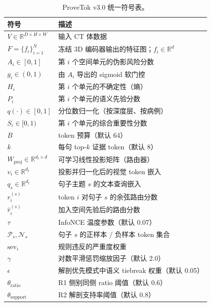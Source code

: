 \documentclass[11pt,a4paper]{article}
\newcommand{\RR}{\mathbb{R}}
\theoremstyle{definition}
\begin{document}
\begin{table}[ht]
\centering\small
\begin{tabularx}{\linewidth}{lX}
\toprule
\textbf{符号} & \textbf{描述} \\
\midrule
$V \in \RR^{D \times H \times W}$ & 输入 CT 体数据 \\
$F = \{f_i\}_{i=1}^{N}$ & 冻结 3D 编码器输出的特征图；$f_i \in \RR^d$ \\
$A_i \in [0,1]$ & 第 $i$ 个空间单元的伪影风险分数 \\
$g_i \in (0,1)$ & 由 $A_i$ 导出的 sigmoid 软门控 \\
$H_i$ & 第 $i$ 个单元的不确定性（熵） \\
$P_i$ & 第 $i$ 个单元的语义先验分数 \\
$q(\cdot) \in [0,1]$ & 分位数归一化（按深度层、按病例） \\
$S_i \in [0,1)$ & 第 $i$ 个单元的综合重要性分数 \\
$B$ & token 预算（默认 64） \\
$k$ & 每句 top-$k$ 证据 token（默认 8） \\
$W_{\mathrm{proj}} \in \RR^{d_t \times d}$ & 可学习线性投影矩阵（路由器） \\
$v_i \in \RR^{d_t}$ & 投影并归一化后的视觉 token 嵌入 \\
$q_s \in \RR^{d_t}$ & 句子主题 $s$ 的文本查询嵌入 \\
$r_i^{(s)}$ & token $i$ 对句子 $s$ 的余弦路由分数 \\
$\hat{r}_i^{(s)}$ & 加入空间先验后的路由分数 \\
$\tau$ & InfoNCE 温度参数（默认 0.07） \\
$\mathcal{P}_s, \mathcal{N}_s$ & 句子 $s$ 的正样本 / 负样本 token 集合 \\
$\mathrm{sev}_i$ & 规则违反的严重度权重 \\
$\gamma$ & 对数平滑惩罚缩放因子（默认 2.0） \\
$\epsilon$ & 解剖优先模式中语义 tiebreak 权重（默认 0.05） \\
$\theta_{\mathrm{ratio}}$ & R1 侧别同侧 ratio 阈值（默认 0.6） \\
$\theta_{\mathrm{support}}$ & R2 解剖支持率阈值（默认 0.8） \\
\bottomrule
\end{tabularx}
\caption{ProveTok v3.0 统一符号表。}
\label{tab:notation}
\end{table}


\end{document}
